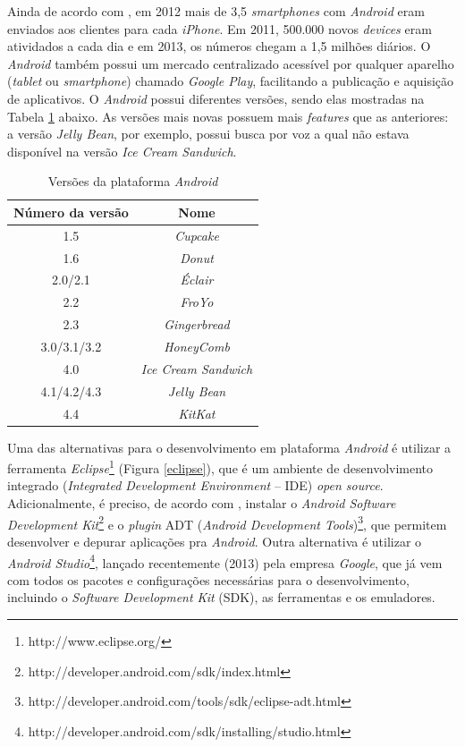 	 Ainda de acordo com \cite{android2013}, em 2012 mais de 3,5 \textit{smartphones} com \textit{Android} eram enviados aos clientes para cada \textit{iPhone}. Em 2011, 500.000 novos \textit{devices} eram atividados a cada dia e em 2013, os números chegam a 1,5 milhões diários. O \textit{Android} também possui um mercado centralizado acessível por qualquer aparelho (\textit{tablet} ou \textit{smartphone}) chamado \textit{Google Play}, facilitando a publicação e aquisição de aplicativos. 
	O \textit{Android}  possui diferentes versões, sendo elas mostradas na Tabela \ref{androidTab} abaixo.  As versões mais novas possuem mais \textit{features} que as anteriores: a versão \textit{Jelly Bean}, por exemplo, possui busca por voz a qual não estava disponível na versão \textit{Ice Cream Sandwich}. 

\begin{table}[ht]
	\centering	
	\begin{tabular}{cc}
		\toprule
		\textbf{Número da versão} & \textbf{Nome}  \\
		\midrule
		1.5 &  \textit{Cupcake} \\
		1.6 & \textit{Donut} \\
		2.0/2.1 &  \textit{Éclair} \\
		2.2 & \textit{FroYo} \\
		2.3 &  \textit{Gingerbread} \\
		3.0/3.1/3.2 & \textit{HoneyComb} \\
		4.0 & \textit{Ice Cream Sandwich} \\
		4.1/4.2/4.3 & \textit{Jelly Bean} \\
		4.4 &  \textit{KitKat} \\

		\bottomrule
	\end{tabular}
	\caption{ Versões da plataforma \textit{Android}}
	\label{androidTab}
\end{table}

	Uma das alternativas para o desenvolvimento em plataforma \textit{Android} é utilizar a ferramenta \textit{Eclipse}\footnote{http://www.eclipse.org/} (Figura \ref{eclipse}), que é um ambiente de desenvolvimento integrado (\textit{Integrated Development Environment} -- IDE) \textit{open source}. Adicionalmente, é preciso, de acordo com \cite{androidsdkmanager}, instalar o \textit{Android Software Development Kit}\footnote{http://developer.android.com/sdk/index.html} e o \textit{plugin} ADT (\textit{Android Development Tools})\footnote{http://developer.android.com/tools/sdk/eclipse-adt.html}, que permitem desenvolver e depurar aplicações pra \textit{Android}. Outra alternativa é utilizar o \textit{Android Studio}\footnote{http://developer.android.com/sdk/installing/studio.html}, lançado recentemente (2013) pela empresa \textit{Google}, que já vem com todos os pacotes e configurações necessárias para o desenvolvimento, incluindo o  \textit{Software Development Kit} (SDK), as ferramentas e os emuladores. 

